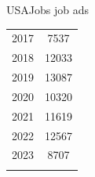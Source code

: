 \documentclass{beamer}
\begin{document}
\begin{frame}{USAJobs job ads}
\begin{table}[ht!]
\begin{subtable}[t]{0.4\linewidth}
\begin{tabular}{cc}
                2017 &   7537\\
                2018 &  12033\\
                2019 &  13087\\
                2020 &  10320\\
                2021 &  11619\\
                2022 &  12567\\
                2023 &   8707\\
            \Xhline{3\arrayrulewidth}
        \end{tabular}\label{tab:aaw_job_opening_count}
    \end{subtable}
\end{table}
  
\end{frame}

\end{document}
